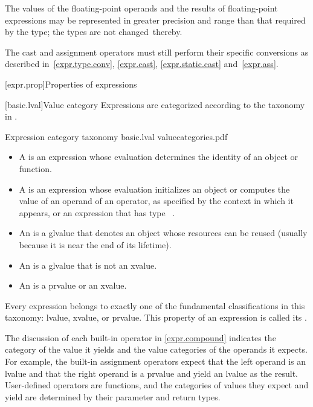 \pnum
The values of the floating-point operands and
the results of floating-point expressions
may be represented in greater precision and range than that
required by the type; the types are not changed\
thereby.
\begin{footnote}
The cast and assignment operators must still perform their specific
conversions as described in~\ref{expr.type.conv}, \ref{expr.cast},
\ref{expr.static.cast} and~\ref{expr.ass}.
\end{footnote}

[expr.prop]{Properties of expressions}

[basic.lval]{Value category}
\pnum
Expressions are categorized according to the taxonomy in .

\begin{importgraphic}
{Expression category taxonomy}
{basic.lval}
{valuecategories.pdf}
\end{importgraphic}

\begin{itemize}
\item A  is an expression whose evaluation determines the identity of an object or function.
\item A \defn{prvalue} is an expression whose evaluation initializes an object
or computes the value of an operand of an operator,
as specified by the context in which it appears,
or an expression that has type \cv{}~.
\item An  is a glvalue that denotes an object whose resources can be reused (usually because it is near the end of its lifetime).
\item An \defn{lvalue} is a glvalue that is not an xvalue.
\item An  is a prvalue or an xvalue.
\end{itemize}

\pnum
Every expression belongs to exactly one of the fundamental classifications in this
taxonomy: lvalue, xvalue, or prvalue. This property of an expression is called
its \defn{value category}.
\begin{note}
The discussion of each built-in operator in
\ref{expr.compound} indicates the category of the value it yields and the value categories
of the operands it expects. For example, the built-in assignment operators expect that
the left operand is an lvalue and that the right operand is a prvalue and yield an
lvalue as the result. User-defined operators are functions, and the categories of
values they expect and yield are determined by their parameter and return types.
\end{note}


